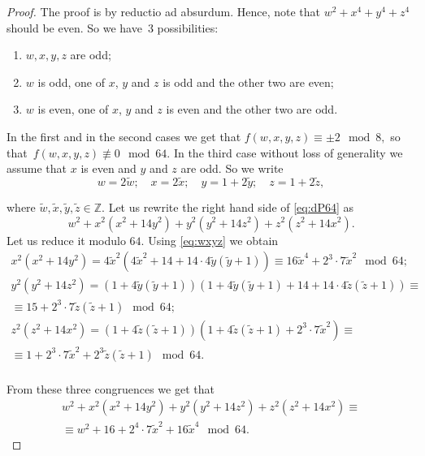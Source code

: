 \documentclass{amsart}
\numberwithin{equation}{section}
\theoremstyle{definition}
\begin{document}
\begin{proof}
The proof is by reductio ad absurdum. Hence,  note that  $w^2+x^4+y^4+z^4$ should be even. So we have~$3$ possibilities: 
\begin{enumerate}
\item $w,x,y,z$ are odd;
\item $w$ is odd, one of $x$, $y$ and $z$ is odd and the other two are even;
\item $w$ is even, one of $x$, $y$ and $z$ is even and the other two are odd.
\end{enumerate}

\noindent In the first and in the second cases we get that $f(w,x,y,z) \equiv \pm 2 \mod 8,$ so that~$f(w,x,y,z) \not\equiv 0 \mod 64.$  In the third case without loss of generality we assume that $x$ is even and $y$ and $z$ are odd. So we write
\begin{equation}\label{eq:wxyz}
w=2\tilde{w}; \quad x=2\tilde{x}; \quad y=1+2\tilde{y}; \quad z=1+2\tilde{z},
\end{equation}


 
\noindent where $\tilde{w}, \tilde{x}, \tilde{y}, \tilde{z} \in \mathbb{Z}.$ Let us rewrite the right hand side of \eqref{eq:dP64} as 
$$
w^2+x^2(x^2+14y^2)+y^2(y^2+14z^2)+z^2(z^2+14x^2).
$$
\noindent Let us reduce it modulo $64.$ Using \eqref{eq:wxyz} we obtain
\begin{gather*}
x^2(x^2+14y^2) = 4\tilde{x}^2(4\tilde{x}^2+14+14\cdot 4\tilde{y}(\tilde{y}+1)) \equiv 16\tilde{x}^4+2^3 \cdot 7\tilde{x}^2 \mod 64;\\
y^2(y^2+14z^2) = (1+4\tilde{y}(\tilde{y}+1))(1+4\tilde{y}(\tilde{y}+1)+14+14\cdot 4\tilde{z}(\tilde{z}+1)) \equiv \\
 \equiv 15+2^3\cdot 7\tilde{z}(\tilde{z}+1) \mod 64;\\
z^2(z^2+14x^2) = (1+4\tilde{z}(\tilde{z}+1))(1+4\tilde{z}(\tilde{z}+1)+2^3\cdot 7\tilde{x}^2) \equiv\\
\equiv 1+2^3 \cdot 7\tilde{x}^2+2^3\tilde{z}(\tilde{z}+1) \mod 64.\\
\end{gather*}

\noindent From these three congruences we get that 
\begin{equation}\label{eq:final64}
\begin{gathered}
w^2+x^2(x^2+14y^2)+y^2(y^2+14z^2)+z^2(z^2+14x^2) \equiv\\
 \equiv w^2+16+2^4\cdot 7\tilde{x}^2+16\tilde{x}^4 \mod 64.
\end{gathered}
\end{equation}


\end{proof}
\end{document}

